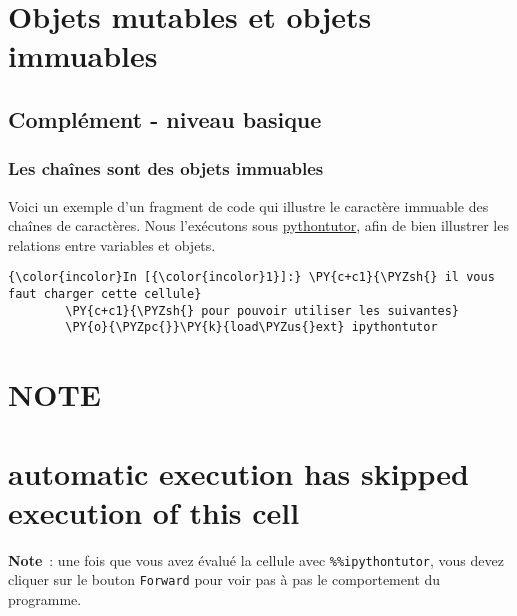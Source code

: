     
    
    
    

    

    \hypertarget{objets-mutables-et-objets-immuables}{%
\section{Objets mutables et objets
immuables}\label{objets-mutables-et-objets-immuables}}

    \hypertarget{compluxe9ment---niveau-basique}{%
\subsection{Complément - niveau
basique}\label{compluxe9ment---niveau-basique}}

    \hypertarget{les-chauxeenes-sont-des-objets-immuables}{%
\subsubsection{Les chaînes sont des objets
immuables}\label{les-chauxeenes-sont-des-objets-immuables}}

    Voici un exemple d'un fragment de code qui illustre le caractère
immuable des chaînes de caractères. Nous l'exécutons sous
\href{pythontutor.com}{pythontutor}, afin de bien illustrer les
relations entre variables et objets.

    \begin{Verbatim}[commandchars=\\\{\}]
{\color{incolor}In [{\color{incolor}1}]:} \PY{c+c1}{\PYZsh{} il vous faut charger cette cellule}
        \PY{c+c1}{\PYZsh{} pour pouvoir utiliser les suivantes}
        \PY{o}{\PYZpc{}}\PY{k}{load\PYZus{}ext} ipythontutor
\end{Verbatim}


    \hypertarget{note}{%
\section{NOTE}\label{note}}

\hypertarget{automatic-execution-has-skipped-execution-of-this-cell}{%
\section{automatic execution has skipped execution of this
cell}\label{automatic-execution-has-skipped-execution-of-this-cell}}

\textbf{Note}~: une fois que vous avez évalué la cellule avec
\texttt{\%\%ipythontutor}, vous devez cliquer sur le bouton
\texttt{Forward} pour voir pas à pas le comportement du programme.

